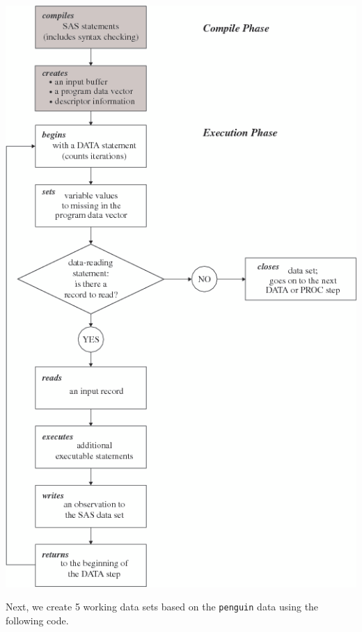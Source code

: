 \documentclass[
]{book}
\begin{document}
\begin{center}\includegraphics[width=1\linewidth]{img08/w08-DataStepProcessing02} \end{center}

Next, we create 5 working data sets based on the \texttt{penguin} data using the following code.
\end{document}
